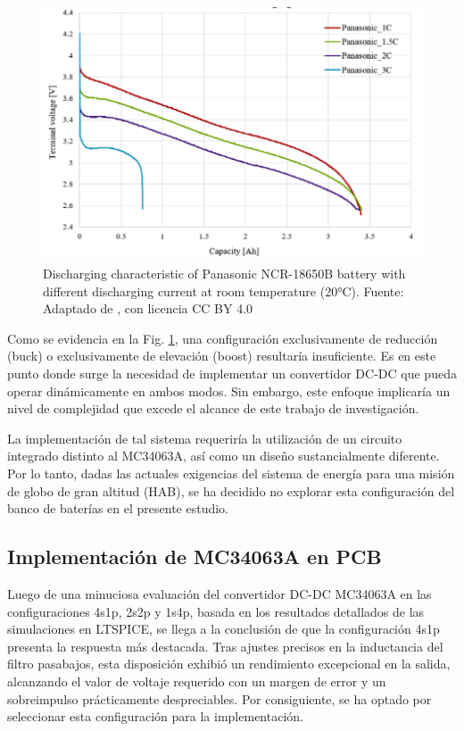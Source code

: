 \begin{figure}[h]
  \centering
  \includegraphics[width=0.45\linewidth]{Pictures/PanasonicCurveDischarge.png} 
  \caption{Discharging characteristic of Panasonic NCR-18650B battery with different discharging current at room temperature (20°C). Fuente: Adaptado de \cite{Kopczynski2018}, con licencia CC BY 4.0}
\label{fig:discharging_characteristic}
\end{figure}

\newpage

Como se evidencia en la Fig. \ref{fig:discharging_characteristic}, una configuración exclusivamente de reducción (buck) o exclusivamente de elevación (boost) resultaría insuficiente. Es en este punto donde surge la necesidad de implementar un convertidor DC-DC que pueda operar dinámicamente en ambos modos. Sin embargo, este enfoque implicaría un nivel de complejidad que excede el alcance de este trabajo de investigación. 

La implementación de tal sistema requeriría la utilización de un circuito integrado distinto al MC34063A, así como un diseño sustancialmente diferente. Por lo tanto, dadas las actuales exigencias del sistema de energía para una misión de globo de gran altitud (HAB), se ha decidido no explorar esta configuración del banco de baterías en el presente estudio.

\vspace{0.75 cm}

\subsection{Implementación de MC34063A en PCB}
\vspace{0.25 cm}
Luego de una minuciosa evaluación del convertidor DC-DC MC34063A en las configuraciones 4s1p, 2s2p y 1s4p, basada en los resultados detallados de las simulaciones en LTSPICE, se llega a la conclusión de que la configuración 4s1p presenta la respuesta más destacada. Tras ajustes precisos en la inductancia del filtro pasabajos, esta disposición exhibió un rendimiento excepcional en la salida, alcanzando el valor de voltaje requerido con un margen de error y un sobreimpulso prácticamente despreciables. Por consiguiente, se ha optado por seleccionar esta configuración para la implementación.

